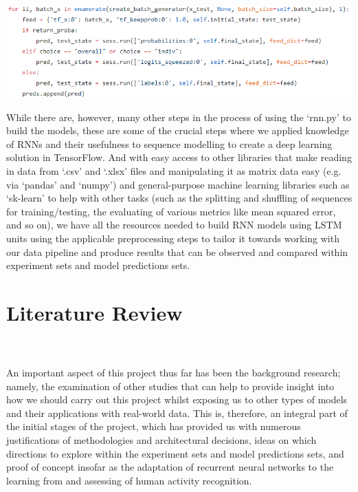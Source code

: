 \documentclass[12pt,twoside]{report}
\begin{document}
\begin{itemize}
\begin{center}
\includegraphics[scale=0.6]{project_figures/fig3_17}
\end{center}
\end{itemize}

\quad While there are, however, many other steps in the process of using the ‘rnn.py’ to build the models, these are some of the crucial steps where we applied knowledge of RNNs and their usefulness to sequence modelling to create a deep learning solution in TensorFlow. And with easy access to other libraries that make reading in data from ‘.csv’ and ‘.xlsx’ files and manipulating it as matrix data easy (e.g. via ‘pandas’ and ‘numpy’) and general-purpose machine learning libraries such as ‘sk-learn’ to help with other tasks (such as the splitting and shuffling of sequences for training/testing, the evaluating of various metrics like mean squared error, and so on), we have all the resources needed to build RNN models using LSTM units using the applicable preprocessing steps to tailor it towards working with our data pipeline and produce results that can be observed and compared within experiment sets and model predictions sets.










\chapter{Literature Review\\~\\}

\quad An important aspect of this project thus far has been the background research; namely, the examination of other studies that can help to provide insight into how we should carry out this project whilst exposing us to other types of models and their applications with real-world data. This is, therefore, an integral part of the initial stages of the project, which has provided us with numerous justifications of methodologies and architectural decisions, ideas on which directions to explore within the experiment sets and model predictions sets, and proof of concept insofar as the adaptation of recurrent neural networks to the learning from and assessing of human activity recognition.\\
\end{document}
